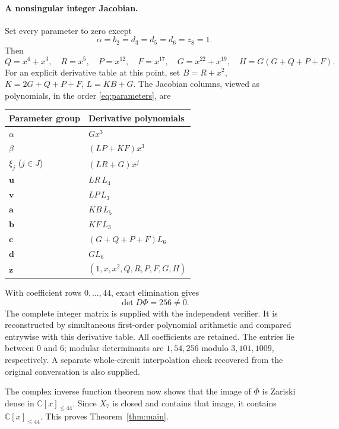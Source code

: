 \documentclass[11pt]{article}
\newcommand{\C}{\mathbb C}
\newcommand{\V}[1]{\C[x]_{\le #1}}
\begin{document}
\paragraph{A nonsingular integer Jacobian.}
Set every parameter to zero except
\begin{equation}\label{eq:point}
 \alpha=b_2=d_3=d_5=d_6=z_8=1.
\end{equation}
Then
\[
 Q=x^4+x^3,\quad R=x^5,\quad P=x^{12},\quad F=x^{17},
 \quad G=x^{22}+x^{19},\quad H=G(G+Q+P+F).
\]
For an explicit derivative table at this point, set
$B=R+x^2$, $K=2G+Q+P+F$, $L=KB+G$. The Jacobian columns, viewed as
polynomials, in the order \eqref{eq:parameters}, are
\begin{center}
\begin{tabular}{@{}ll@{}}
\toprule
Parameter group & Derivative polynomials\\
\midrule
$\alpha$ & $Gx^3$\\
$\beta$ & $(LP+KF)x^3$\\
$\xi_j$ ($j\in J$) & $(LR+G)x^j$\\
$\mathbf u$ & $LR\,L_4$\\
$\mathbf v$ & $LP\,L_3$\\
$\mathbf a$ & $KB\,L_5$\\
$\mathbf b$ & $KF\,L_3$\\
$\mathbf c$ & $(G+Q+P+F)L_6$\\
$\mathbf d$ & $G L_6$\\
$\mathbf z$ & $(1,x,x^2,Q,R,P,F,G,H)$\\
\bottomrule
\end{tabular}
\end{center}
With coefficient rows $0,\ldots,44$, exact elimination gives
\begin{equation}\label{eq:det}
 \det D\Phi=256\ne0.
\end{equation}
The complete integer matrix is supplied with the independent verifier.
It is reconstructed by simultaneous first-order polynomial arithmetic and
compared entrywise with this derivative table. All coefficients are retained.
The entries lie between $0$ and $6$; modular determinants are $1,54,256$
modulo $3,101,1009$, respectively. A separate whole-circuit interpolation
check recovered from the original conversation is also supplied.

The complex inverse function theorem now shows that the image of $\Phi$
is Zariski dense in $\V{44}$. Since $X_7$ is closed and contains that
image, it contains $\V{44}$. This proves Theorem~\ref{thm:main}.
\end{document}
